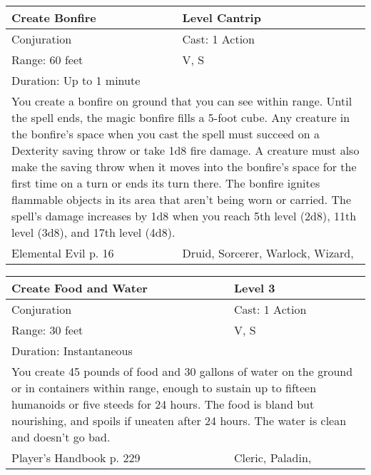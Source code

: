 \documentclass[11pt]{report}
\begin{document}
\begin{table}[H]
	\begin{tabular}{||p{6cm}|p{6cm}||}
		\hline\hline
		\bf{Create Bonfire} & Level Cantrip\\ \hline
		Conjuration & Cast: 1 Action\\ \hline
		Range: 60 feet & V, S\\ \hline
		Duration: Up to 1 minute & \\ \hline
		\multicolumn{2}{||p{12cm}||}{You create a bonfire on ground that you can see within range. Until the spell ends, the magic bonfire fills a 5-foot cube. Any creature in the bonfire’s space when you cast the spell must succeed on a Dexterity saving throw or take 1d8 fire damage. A creature must also make the saving throw when it moves into the bonfire’s space for the first time on a turn or ends its turn there.
The bonfire ignites flammable objects in its area that aren’t being worn or carried.
The spell’s damage increases by 1d8 when you reach 5th level (2d8), 11th level (3d8), and 17th level (4d8).}\\ \hline
Elemental Evil p. 16 & Druid, Sorcerer, Warlock, Wizard, \\ \hline\hline
	\end{tabular}
\end{table}

\begin{table}[H]
	\begin{tabular}{||p{6cm}|p{6cm}||}
		\hline\hline
		\bf{Create Food and Water} & Level 3\\ \hline
		Conjuration & Cast: 1 Action\\ \hline
		Range: 30 feet & V, S\\ \hline
		Duration: Instantaneous & \\ \hline
		\multicolumn{2}{||p{12cm}||}{You create 45 pounds of food and 30 gallons of water on the ground or in containers within range, enough to sustain up to fifteen humanoids or five steeds for 24 hours. The food is bland but nourishing, and spoils if uneaten after 24 hours. The water is clean and doesn’t go bad.}\\ \hline
Player's Handbook p. 229 & Cleric, Paladin, \\ \hline\hline
	\end{tabular}
\end{table}
\end{document}
